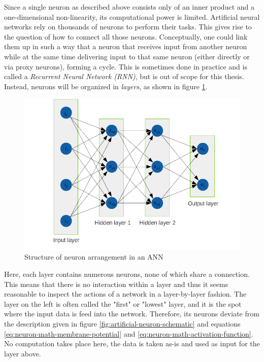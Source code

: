 \documentclass[11pt, a4paper]{article}
\begin{document}
Since a single neuron as described above consists only of an inner product and a one-dimensional non-linearity, its computational power is limited. Artificial neural networks rely on thousands of neurons to perform their tasks. This gives rise to the question of how to connect all those neurons. Conceptually, one could link them up in such a way that a neuron that receives input from another neuron while at the same time delivering input to that same neuron (either directly or via proxy neurons), forming a cycle. This is sometimes done in practice and is called a \emph{Recurrent Neural Network (RNN)}, but is out of scope for this thesis. Instead, neurons will be organized in \emph{layers}, as shown in figure \ref{fig:neural-nework-structure}. %

\begin{figure}[htp]
\centering
\includegraphics[width=\textwidth]{images/network_layout.png}
\caption{Structure of neuron arrangement in an ANN}
\label{fig:neural-nework-structure}
\end{figure}

Here, each layer contains numerous neurons, none of which share a connection. This means that there is no interaction within a layer and thus it seems reasonable to inspect the actions of a network in a layer-by-layer fashion. The layer on the left is often called the "first" or "lowest" layer, and it is the spot where the input data is feed into the network. Therefore, its neurons deviate from the description given in figure \ref{fig:artificial-neuron-schematic} and equations \eqref{eq:neuron-math-membrane-potential} and \eqref{eq:neuron-math-activation-function}. No computation takes place here, the data is taken as-is and used as input for the layer above.
\end{document}
